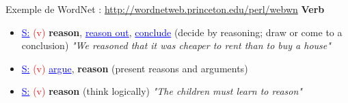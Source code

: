 \documentclass[xcolor=table]{beamer}
\begin{document}
\begin{frame}
\begin{exampleblock}{Exemple de WordNet : \small\url{http://wordnetweb.princeton.edu/perl/webwn}}
	{\small\bfseries Verb}
	\begin{itemize}
		\item \textcolor{blue}{\underline{S:}} \textcolor{red}{(v)} \textbf{reason}, \textcolor{blue}{\underline{reason out}}, \textcolor{blue}{\underline{conclude}} (decide by reasoning; draw or come to a conclusion) \textit{"We reasoned that it was cheaper to rent than to buy a house"}
		\item \textcolor{blue}{\underline{S:}} \textcolor{red}{(v)} \textcolor{blue}{\underline{argue}}, \textbf{reason} (present reasons and arguments)
		\item \textcolor{blue}{\underline{S:}} \textcolor{red}{(v)} \textbf{reason} (think logically) \textit{"The children must learn to reason"}
	\end{itemize}
\end{exampleblock}
	
\end{frame}
\end{document}

